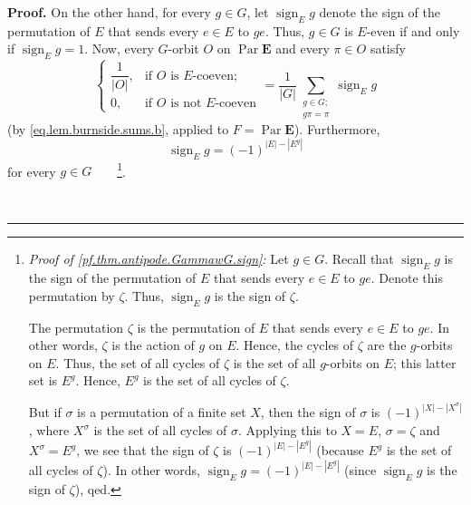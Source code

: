 \documentclass[numbers=enddot,12pt,final,onecolumn,notitlepage,abstracton]{scrartcl}%
\theoremstyle{definition}
\newenvironment{proof}[1][Proof]{\noindent\textbf{#1.} }{\ \rule{0.5em}{0.5em}}
\let\sumnonlimits\sum
\renewcommand{\sum}{\sumnonlimits\limits}
\newcommand{\Par}{\operatorname{Par}}
\newcommand{\sign}{\operatorname{sign}}
\newcommand{\EE}{{\mathbf{E}}}
\begin{document}
\begin{proof}
On the other hand, for every $g\in G$, let $\sign_E g$
denote the sign of the permutation of $E$ that sends every
$e\in E$ to $ge$. Thus, $g\in G$ is $E$-even if and only if
$\sign_E g = 1$. Now, every $G$-orbit $O$ on $\Par \EE $
and every $\pi\in O$ satisfy%
\begin{equation}%
\begin{cases}
\dfrac{1}{\left\vert O\right\vert }, & \text{if }O\text{ is }E\text{-coeven};\\
0, & \text{if }O\text{ is not }E\text{-coeven}%
\end{cases}
=\dfrac{1}{\left\vert G\right\vert }\sum_{\substack{g\in G; \\ g\pi = \pi}}
\sign_E g
\label{pf.thm.antipode.GammawG.signed}
\end{equation}
(by \eqref{eq.lem.burnside.sums.b}, applied to $F = \Par\EE$). Furthermore,
\begin{equation}
\sign_E g = \left(  -1\right)  ^{\left\vert
E\right\vert -\left\vert E^{g}\right\vert }
\label{pf.thm.antipode.GammawG.sign}
\end{equation}
for every $g\in G$\ \ \ \ \footnote{\textit{Proof of
\eqref{pf.thm.antipode.GammawG.sign}:} Let $g\in G$. Recall that
$\sign_E g$ is the sign of the permutation of $E$
that sends every $e\in E$ to $ge$. Denote this permutation by $\zeta$.
Thus, $\sign_E g$ is the sign of $\zeta$.
\par
The permutation $\zeta$ is the permutation of $E$
that sends every $e \in E$ to $ge$. In other words,
$\zeta$ is the action of $g$ on $E$.
Hence, the cycles of $\zeta$ are the $g$-orbits on $E$.
Thus, the set of all cycles of $\zeta$ is the set
of all $g$-orbits on $E$; this latter set is $E^g$.
Hence, $E^g$ is the set of all cycles of $\zeta$.
\par
But if $\sigma$ is a permutation of a
finite set $X$, then the sign of $\sigma$ is $\left(  -1\right)  ^{\left\vert
X\right\vert -\left\vert X^{\sigma}\right\vert }$, where $X^{\sigma}$ is the
set of all cycles of $\sigma$. Applying this to $X=E$,
$\sigma=\zeta$ and $X^{\sigma}=E^{g}$, we see that the sign of $\zeta$
is $\left(  -1\right)  ^{\left\vert
E\right\vert -\left\vert E^{g}\right\vert }$
(because $E^g$ is the set of all cycles of $\zeta$).
In other words,
$\sign_E g = \left(  -1\right)  ^{\left\vert
E\right\vert -\left\vert E^{g}\right\vert }$ (since
$\sign_E g$ is the sign of $\zeta$), qed.}.



\end{proof}
\end{document}

